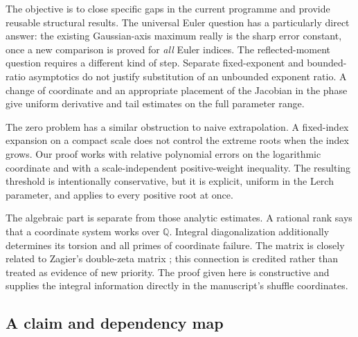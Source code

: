 \documentclass[11pt,letterpaper]{article}
\theoremstyle{definition}
\theoremstyle{remark}
\begin{document}
The objective is to close specific gaps in the current programme and
provide reusable structural results. The universal Euler question has a
particularly direct answer: the existing Gaussian-axis maximum really is
the sharp error constant, once a new comparison is proved for \emph{all}
Euler indices. The reflected-moment question requires a different kind of
step. Separate fixed-exponent and bounded-ratio asymptotics do not justify
substitution of an unbounded exponent ratio. A change of coordinate and
an appropriate placement of the Jacobian in the phase give uniform
derivative and tail estimates on the full parameter range.

The zero problem has a similar obstruction to naive extrapolation. A
fixed-index expansion on a compact scale does not control the extreme
roots when the index grows. Our proof works with relative polynomial
errors on the logarithmic coordinate and with a scale-independent
positive-weight inequality. The resulting threshold is intentionally
conservative, but it is explicit, uniform in the Lerch parameter, and
applies to every positive root at once.

The algebraic part is separate from those analytic estimates. A rational
rank says that a coordinate system works over $\mathbb Q$. Integral
diagonalization additionally determines its torsion and all primes of
coordinate failure. The matrix is closely related to Zagier's double-zeta
matrix \cite{Zagier,Ma,MaTeo}; this connection is credited rather than
treated as evidence of new priority. The proof given here is constructive
and supplies the integral information directly in the manuscript's
shuffle coordinates.

\subsection{A claim and dependency map}
\end{document}
